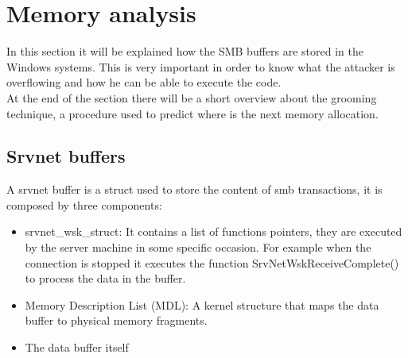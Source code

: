 \section{Memory analysis}
In this section it will be explained how the SMB buffers are stored in the Windows systems. This is very important in order to know 
what the attacker is overflowing and how he can be able to execute the code.\\
At the end of the section there will be a short overview about the grooming technique, a procedure used to predict where is the next memory allocation.
\subsection{Srvnet buffers}
A srvnet buffer is a struct used to store the content of smb transactions, it is composed by three components:
\begin{itemize}
    \item srvnet\_wsk\_struct: It contains a list of functions pointers, they are executed by the server machine in some specific occasion. For example
    when the connection is stopped it executes the function SrvNetWskReceiveComplete() to process the data in the buffer.
    \item Memory Description List (MDL): A kernel structure that maps the data buffer to physical memory fragments.
    \item The data buffer itself
\end{itemize}

